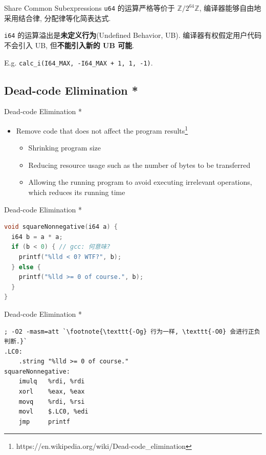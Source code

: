 ﻿\documentclass{ctexbeamer}
\begin{document}
\begin{frame}{Share Common Subexpressions}
  \qquad \texttt{u64} 的运算严格等价于 $\mathbb Z/2^{64}\mathbb Z$, 编译器能够自由地采用结合律, 分配律等化简表达式.
  
  \qquad \texttt{i64} 的运算溢出是\textbf{未定义行为}(Undefined Behavior, UB). 编译器有权假定用户代码不会引入 UB, 但\textbf{不能引入新的 UB 可能}.

  \qquad E.g. \texttt{calc\_i(I64\_MAX, -I64\_MAX + 1, 1, -1)}.
\end{frame}

\subsection{Dead-code Elimination *}

\begin{frame}{Dead-code Elimination *}
  \begin{itemize}
    \item Remove code that does not affect the program results\footnote{https://en.wikipedia.org/wiki/Dead-code\_elimination}
    \begin{itemize}
      \item Shrinking program size
      \item Reducing resource usage such as the number of bytes to be transferred
      \item Allowing the running program to avoid executing irrelevant operations, which reduces its running time
    \end{itemize}
  \end{itemize}
\end{frame}

\begin{frame}[fragile]{Dead-code Elimination *}
  \begin{lstlisting}[language=C]
void squareNonnegative(i64 a) {
  i64 b = a * a;
  if (b < 0) { // gcc: 何意味?
    printf("%lld < 0? WTF?", b);
  } else {
    printf("%lld >= 0 of course.", b);
  }
}
  \end{lstlisting}
\end{frame}

\begin{frame}[fragile]{Dead-code Elimination *}
  \begin{lstlisting}[language=x86_64]
; -O2 -masm=att `\footnote{\texttt{-Og} 行为一样, \texttt{-O0} 会进行正负判断.}`
.LC0:
    .string "%lld >= 0 of course."
squareNonnegative:
    imulq   %rdi, %rdi
    xorl    %eax, %eax
    movq    %rdi, %rsi
    movl    $.LC0, %edi
    jmp     printf
  \end{lstlisting}
\end{frame}
\end{document}
